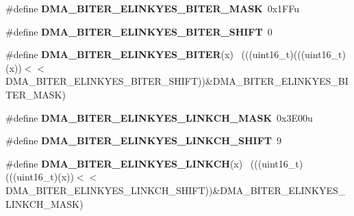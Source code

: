 \begin{DoxyCompactItemize}
\item 
\hypertarget{group___d_m_a___register___masks_ga6e5cea6df954df3bc7501c0074e7c52b}{}\#define {\bfseries D\+M\+A\+\_\+\+B\+I\+T\+E\+R\+\_\+\+E\+L\+I\+N\+K\+Y\+E\+S\+\_\+\+B\+I\+T\+E\+R\+\_\+\+M\+A\+S\+K}~0x1\+F\+Fu\label{group___d_m_a___register___masks_ga6e5cea6df954df3bc7501c0074e7c52b}

\item 
\hypertarget{group___d_m_a___register___masks_ga6528aadc37f35d20d63354f8b755d11e}{}\#define {\bfseries D\+M\+A\+\_\+\+B\+I\+T\+E\+R\+\_\+\+E\+L\+I\+N\+K\+Y\+E\+S\+\_\+\+B\+I\+T\+E\+R\+\_\+\+S\+H\+I\+F\+T}~0\label{group___d_m_a___register___masks_ga6528aadc37f35d20d63354f8b755d11e}

\item 
\hypertarget{group___d_m_a___register___masks_ga039a1177a4af249a8e6cc43bab4ad37f}{}\#define {\bfseries D\+M\+A\+\_\+\+B\+I\+T\+E\+R\+\_\+\+E\+L\+I\+N\+K\+Y\+E\+S\+\_\+\+B\+I\+T\+E\+R}(x)                        ~(((uint16\+\_\+t)(((uint16\+\_\+t)(x))$<$$<$D\+M\+A\+\_\+\+B\+I\+T\+E\+R\+\_\+\+E\+L\+I\+N\+K\+Y\+E\+S\+\_\+\+B\+I\+T\+E\+R\+\_\+\+S\+H\+I\+F\+T))\&D\+M\+A\+\_\+\+B\+I\+T\+E\+R\+\_\+\+E\+L\+I\+N\+K\+Y\+E\+S\+\_\+\+B\+I\+T\+E\+R\+\_\+\+M\+A\+S\+K)\label{group___d_m_a___register___masks_ga039a1177a4af249a8e6cc43bab4ad37f}

\item 
\hypertarget{group___d_m_a___register___masks_gaae29d9573a40f548fb59ef26557d43df}{}\#define {\bfseries D\+M\+A\+\_\+\+B\+I\+T\+E\+R\+\_\+\+E\+L\+I\+N\+K\+Y\+E\+S\+\_\+\+L\+I\+N\+K\+C\+H\+\_\+\+M\+A\+S\+K}~0x3\+E00u\label{group___d_m_a___register___masks_gaae29d9573a40f548fb59ef26557d43df}

\item 
\hypertarget{group___d_m_a___register___masks_gac10d4afb5b6f8caa42e7ef897b700cd6}{}\#define {\bfseries D\+M\+A\+\_\+\+B\+I\+T\+E\+R\+\_\+\+E\+L\+I\+N\+K\+Y\+E\+S\+\_\+\+L\+I\+N\+K\+C\+H\+\_\+\+S\+H\+I\+F\+T}~9\label{group___d_m_a___register___masks_gac10d4afb5b6f8caa42e7ef897b700cd6}

\item 
\hypertarget{group___d_m_a___register___masks_gaa5ab7b37f993178350376841f3bf25a7}{}\#define {\bfseries D\+M\+A\+\_\+\+B\+I\+T\+E\+R\+\_\+\+E\+L\+I\+N\+K\+Y\+E\+S\+\_\+\+L\+I\+N\+K\+C\+H}(x)                      ~(((uint16\+\_\+t)(((uint16\+\_\+t)(x))$<$$<$D\+M\+A\+\_\+\+B\+I\+T\+E\+R\+\_\+\+E\+L\+I\+N\+K\+Y\+E\+S\+\_\+\+L\+I\+N\+K\+C\+H\+\_\+\+S\+H\+I\+F\+T))\&D\+M\+A\+\_\+\+B\+I\+T\+E\+R\+\_\+\+E\+L\+I\+N\+K\+Y\+E\+S\+\_\+\+L\+I\+N\+K\+C\+H\+\_\+\+M\+A\+S\+K)\label{group___d_m_a___register___masks_gaa5ab7b37f993178350376841f3bf25a7}


\end{DoxyCompactItemize}
